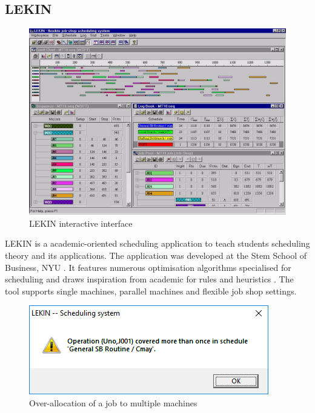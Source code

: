 \subsection{LEKIN}

\begin{figure}[H]
	\begin{center}
		\includegraphics[width=\linewidth]{figures/lekin_gui.jpg}
	\end{center}
	\caption{LEKIN interactive interface \cite{lekin}}
\end{figure}

LEKIN is a academic-oriented scheduling application to teach students scheduling theory and its applications. The application was developed at the Stem School of Business, NYU \cite{lekin}. It features numerous optimisation algorithms specialised for scheduling and draws inspiration from academic for rules and heuristics \cite{sta}. The tool supports single machines, parallel machines and flexible job shop settings.

\begin{figure}[H]
	\begin{center}
		\includegraphics[scale=0.8]{figures/lekin_overallocated.png}
	\end{center}
	\caption{Over-allocation of a job to multiple machines}
	\label{lekinover}
\end{figure}

